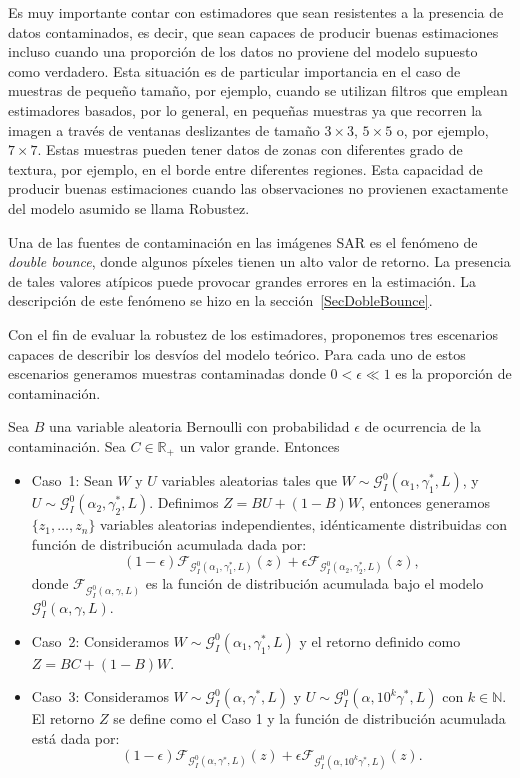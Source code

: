 Es muy importante contar con estimadores que sean resistentes a la presencia de datos contaminados, es decir, que sean capaces de producir buenas estimaciones incluso cuando una proporción de los datos no proviene del modelo supuesto como verdadero. Esta situación es de particular importancia en el caso de muestras de pequeño tamaño, por ejemplo, cuando se utilizan filtros que emplean estimadores basados, por lo general, en pequeñas muestras ya que recorren la imagen a través de ventanas deslizantes de tamaño $3 \times 3$, $5 \times 5$ o, por ejemplo, $7 \times 7$. Estas muestras pueden tener datos de zonas con diferentes grado de textura, por ejemplo, en el borde entre diferentes regiones. Esta capacidad de producir buenas estimaciones cuando las observaciones no provienen exactamente del modelo asumido se llama Robustez.

Una de las fuentes de contaminación en las imágenes SAR es el fenómeno de \textit{double bounce}, donde algunos píxeles tienen un alto valor de retorno.  La presencia de tales valores atípicos puede provocar grandes errores en la estimación. La descripción de este fenómeno se hizo en la sección~\ref{SecDobleBounce}.

Con el fin de evaluar la robustez de los estimadores, proponemos tres escenarios capaces de describir los desvíos del modelo teórico. Para cada uno de estos escenarios generamos muestras contaminadas donde $0<\epsilon \ll 1$ es la proporción de contaminación. 

Sea  $B$ una variable aleatoria Bernoulli con probabilidad $\epsilon$ de ocurrencia de la contaminación. Sea $C \in \mathbb R_+$ un valor grande. Entonces
\begin{itemize}
	\item \label{ContCaso1}Caso~1:
	Sean $W$ y $U$ variables aleatorias tales que $W \sim \mathcal{G}_I^0(\alpha_1,\gamma_1^*,L)$, y $U \sim \mathcal{G}_I^0(\alpha_2,\gamma_2^*,L) $. Definimos $Z=BU+(1-B)W$, entonces generamos $\{z_1,\dots,z_n\}$ variables aleatorias independientes, idénticamente distribuidas con función de distribución acumulada dada por:
	$$
	(1-\epsilon) \mathcal{F}_{\mathcal{G}_I^0(\alpha_1,\gamma_1^*,L)}(z)+\epsilon\mathcal{F}_{\mathcal{G}_I^0(\alpha_2,\gamma_2^*,L)}(z),
	$$
	donde $\mathcal{F}_{\mathcal{G}_I^0(\alpha,\gamma,L)}$ es la función de distribución acumulada bajo el modelo $\mathcal{G}_I^0(\alpha,\gamma,L)$.
	\item \label{Caso2}Caso~2: Consideramos $W \sim \mathcal{G}_I^0(\alpha_1,\gamma_1^*,L)$ y el retorno definido como $Z=BC+(1-B)W$.
	\item \label{Caso3}Caso~3:
	Consideramos $W \sim \mathcal{G}_I^0(\alpha,\gamma^*,L)$ y $U\sim \mathcal{G}_I^0(\alpha,10^k\gamma^*,L) $ con $k \in \mathbb{N}$. 
	El retorno $Z$ se define como el Caso 1 y la función de distribución acumulada está dada por: 
	$$
	(1-\epsilon) \mathcal{F}_{\mathcal{G}_I^0(\alpha,\gamma^*,L)}(z)+\epsilon\mathcal{F}_{\mathcal{G}_I^0(\alpha,10^k\gamma^*,L)}(z).
	$$
\end{itemize}

